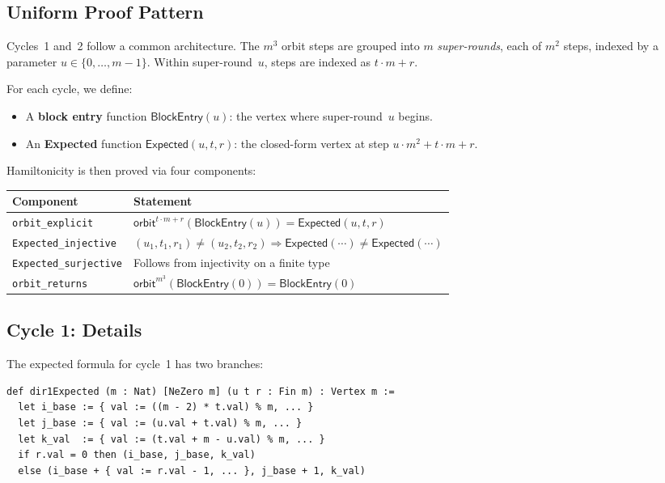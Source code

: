 \documentclass[11pt,a4paper]{article}
\begin{document}
\subsection{Uniform Proof Pattern}

Cycles~1 and~2 follow a common architecture.  The $m^3$ orbit steps are grouped into
$m$ \emph{super-rounds}, each of $m^2$ steps, indexed by a parameter $u \in \{0, \ldots, m{-}1\}$.
Within super-round~$u$, steps are indexed as $t \cdot m + r$.

For each cycle, we define:
\begin{itemize}
  \item A \textbf{block entry} function $\mathsf{BlockEntry}(u)$: the vertex where
    super-round~$u$ begins.
  \item An \textbf{Expected} function $\mathsf{Expected}(u, t, r)$: the closed-form vertex
    at step $u \cdot m^2 + t \cdot m + r$.
\end{itemize}

Hamiltonicity is then proved via four components:

\begin{center}
\begin{tabular}{ll}
\toprule
\textbf{Component} & \textbf{Statement} \\
\midrule
\texttt{orbit\_explicit} & $\mathsf{orbit}^{t \cdot m + r}(\mathsf{BlockEntry}(u)) = \mathsf{Expected}(u, t, r)$ \\
\texttt{Expected\_injective} & $(u_1, t_1, r_1) \ne (u_2, t_2, r_2) \Rightarrow \mathsf{Expected}(\cdots) \ne \mathsf{Expected}(\cdots)$ \\
\texttt{Expected\_surjective} & Follows from injectivity on a finite type \\
\texttt{orbit\_returns} & $\mathsf{orbit}^{m^3}(\mathsf{BlockEntry}(0)) = \mathsf{BlockEntry}(0)$ \\
\bottomrule
\end{tabular}
\end{center}

\subsection{Cycle 1: Details}

The expected formula for cycle~1 has two branches:

\begin{lstlisting}[caption={Cycle 1 expected formula}]
def dir1Expected (m : Nat) [NeZero m] (u t r : Fin m) : Vertex m :=
  let i_base := { val := ((m - 2) * t.val) % m, ... }
  let j_base := { val := (u.val + t.val) % m, ... }
  let k_val  := { val := (t.val + m - u.val) % m, ... }
  if r.val = 0 then (i_base, j_base, k_val)
  else (i_base + { val := r.val - 1, ... }, j_base + 1, k_val)
\end{lstlisting}
\end{document}

